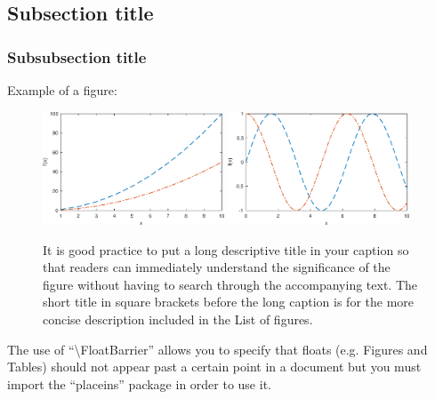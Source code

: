 \documentclass[11pt,a4paper,oneside]{book}
\begin{document}
\subsection{Subsection title}
\subsubsection{Subsubsection title}
Example of a figure:
\begin{figure}[h]
\begin{center}
\includegraphics[width=0.48\textwidth]{subfig1.eps}\hfill
\includegraphics[width=0.48\textwidth]{subfig2.eps}
\caption[Short figure title]{It is good practice to put a long descriptive title in your caption so that readers can immediately understand the significance of the figure without having to search through the accompanying text. The short title in square brackets before the long caption is for the more concise description included in the List of figures.}
\label{fig:1_example1}
\end{center}
\end{figure}
\FloatBarrier The use of ``\textbackslash FloatBarrier'' allows you to specify that floats (e.g. Figures and Tables) should not appear past a certain point in a document but you must import the ``placeins'' package in order to use it.
\end{document}
